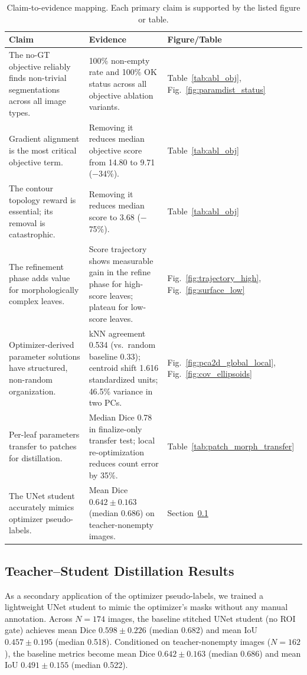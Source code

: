 \documentclass[11pt,a4paper]{article}
\begin{document}
\begin{table}[t]
\centering
\caption{Claim-to-evidence mapping. Each primary claim is supported by the listed figure or table.}
\label{tab:claim_evidence}
\begin{tabular}{p{} p{} p{}}
\toprule
\textbf{Claim} & \textbf{Evidence} & \textbf{Figure/Table} \\
\midrule
The no-GT objective reliably finds non-trivial segmentations across all image types. & 100\% non-empty rate and 100\% OK status across all objective ablation variants. & Table~\ref{tab:abl_obj}, Fig.~\ref{fig:paramdist_status} \\
\midrule
Gradient alignment is the most critical objective term. & Removing it reduces median objective score from 14.80 to 9.71 ($-$34\%). & Table~\ref{tab:abl_obj} \\
\midrule
The contour topology reward is essential; its removal is catastrophic. & Removing it reduces median score to 3.68 ($-$75\%). & Table~\ref{tab:abl_obj} \\
\midrule
The refinement phase adds value for morphologically complex leaves. & Score trajectory shows measurable gain in the refine phase for high-score leaves; plateau for low-score leaves. & Fig.~\ref{fig:trajectory_high}, Fig.~\ref{fig:surface_low} \\
\midrule
Optimizer-derived parameter solutions have structured, non-random organization. & kNN agreement 0.534 (vs.\ random baseline 0.33); centroid shift 1.616 standardized units; 46.5\% variance in two PCs. & Fig.~\ref{fig:pca2d_global_local}, Fig.~\ref{fig:cov_ellipsoids} \\
\midrule
Per-leaf parameters transfer to patches for distillation. & Median Dice 0.78 in finalize-only transfer test; local re-optimization reduces count error by 35\%. & Table~\ref{tab:patch_morph_transfer} \\
\midrule
The UNet student accurately mimics optimizer pseudo-labels. & Mean Dice $0.642\pm0.163$ (median 0.686) on teacher-nonempty images. & Section~\ref{sec:distillation_results} \\
\bottomrule
\end{tabular}
\end{table}

\subsection{Teacher--Student Distillation Results}
\label{sec:distillation_results}
As a secondary application of the optimizer pseudo-labels, we trained a lightweight UNet student to mimic the optimizer's masks without any manual annotation. Across $N=174$ images, the baseline stitched UNet student (no ROI gate) achieves mean Dice $0.598\pm0.226$ (median 0.682) and mean IoU $0.457\pm0.195$ (median 0.518). Conditioned on teacher-nonempty images ($N=162$), the baseline metrics become mean Dice $0.642\pm0.163$ (median 0.686) and mean IoU $0.491\pm0.155$ (median 0.522).
\end{document}

